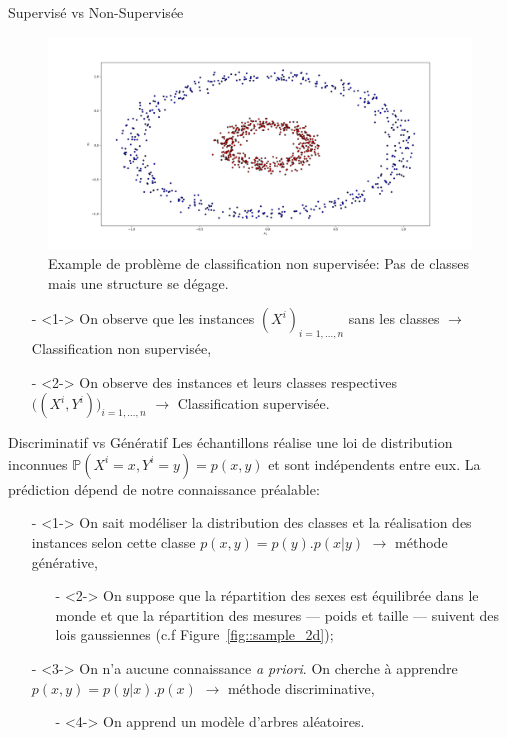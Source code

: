 \documentclass[9pt]{beamer}
\begin{document}
	\begin{frame}{Supervisé vs Non-Supervisée}
		\begin{figure}[H]
			\begin{center}
				\includegraphics[width=.7\textwidth]{circles}
				\caption{\label{fig::circles} Example de problème de classification non supervisée: Pas de classes mais une structure se dégage.}
			\end{center}
		\end{figure}
		\begin{itemize}
			\item[-]<1-> On observe que les instances $(X^i)_{i=1,\dots,n}$ sans les classes $\longrightarrow$ Classification non supervisée,
			\item[-]<2-> On observe des instances et leurs classes respectives $\Big((X^i, Y^i)\Big)_{i=1,\dots,n}$ $\longrightarrow$ Classification supervisée.
		\end{itemize}
	\end{frame}

	\begin{frame}{Discriminatif vs Génératif}
		Les échantillons réalise une loi de distribution inconnues $\mathbb{P}(X^i=x,Y^i=y)=p(x,y)$ et sont indépendents entre eux. La prédiction dépend de notre connaissance préalable:
		\begin{itemize}
			\item[-]<1-> On sait modéliser la distribution des classes et la réalisation des instances selon cette classe $p(x,y) = p(y).p(x\vert y)$ $\longrightarrow$ méthode générative,
			\begin{itemize}
				\item[-]<2-> On suppose que la répartition des sexes est équilibrée dans le monde et que la répartition des mesures --- poids et taille --- suivent des lois gaussiennes (c.f Figure~\ref{fig::sample_2d});
			\end{itemize}
			\item[-]<3-> On n'a aucune connaissance \textit{a priori}. On cherche à apprendre $ p(x,y) = p(y \vert x).p(x)$ $\longrightarrow$ méthode discriminative,
			\begin{itemize}
				\item[-]<4-> On apprend un modèle d'arbres aléatoires.
			\end{itemize}
		\end{itemize}
	\end{frame}
\end{document}
